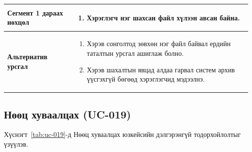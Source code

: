 \begin{table}[H]
\begin{tabular}{|p{3.8cm}|p{10.2cm}|}
        \textbf{Сегмент 1 дараах нөхцөл} &
        \begin{enumerate}
            \item Хэрэглэгч нэг шахсан файл хүлээн авсан байна.
        \end{enumerate}
        \\ \hline
        \textbf{Альтернатив урсгал} &
        \begin{enumerate}
            \item Хэрэв сонголтод зөвхөн нэг файл байвал ердийн таталтын урсгал ашиглаж болно.
            \item Хэрэв шахалтын явцад алдаа гарвал систем архив үүсгэхгүй бөгөөд хэрэглэгчид мэдээлнэ.
        \end{enumerate}
        \\ \hline
    \end{tabular}
\end{table}

\subsection{Нөөц хуваалцах (UC-019)}

Хүснэгт~\ref{tab:uc-019}-д Нөөц хуваалцах юзкейсийн дэлгэрэнгүй тодорхойлолтыг үзүүлэв.

